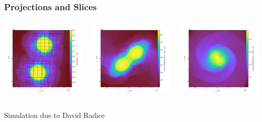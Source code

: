 \documentclass[]{beamer}
\begin{document}
\begin{frame}
  \frametitle{Projections and Slices}
  \begin{columns}
    \column{4cm}
    \begin{center}
      \includegraphics[width=4cm]{figures/bns-it-0000016384-slice.png}
    \end{center}
    \column{4cm}
    \begin{center}
      \includegraphics[width=4cm]{figures/bns-it-0000163840-projection.png}
    \end{center}
    \column{4cm}
    \begin{center}
      \includegraphics[width=4cm]{figures/bns-it-0000294912-projection.png}
    \end{center}    
  \end{columns}
  Simulation due to David Radice
\end{frame}
\end{document}
